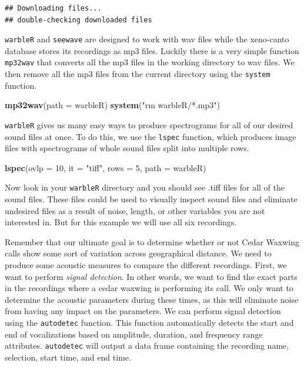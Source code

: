 \documentclass[
]{krantz}
\newenvironment{Shaded}{\begin{snugshade}}{\end{snugshade}}
\newcommand{\DataTypeTok}[1]{\textcolor[rgb]{0.13,0.29,0.53}{#1}}
\newcommand{\DecValTok}[1]{\textcolor[rgb]{0.00,0.00,0.81}{#1}}
\newcommand{\KeywordTok}[1]{\textcolor[rgb]{0.13,0.29,0.53}{\textbf{#1}}}
\newcommand{\NormalTok}[1]{#1}
\newcommand{\StringTok}[1]{\textcolor[rgb]{0.31,0.60,0.02}{#1}}
\begin{document}
\begin{verbatim}
## Downloading files...
## double-checking downloaded files
\end{verbatim}

\texttt{warbleR} and \texttt{seewave} are designed to work with wav files while the xeno-canto database stores its recordings as mp3 files. Luckily there is a very simple function \texttt{mp32wav} that converts all the mp3 files in the working directory to wav files. We then remove all the mp3 files from the current directory using the \texttt{system} function.

\begin{Shaded}
\begin{Highlighting}[]
\KeywordTok{mp32wav}\NormalTok{(}\DataTypeTok{path =} \StringTok{\textquotesingle{}warbleR\textquotesingle{}}\NormalTok{)}
\KeywordTok{system}\NormalTok{(}\StringTok{"rm warbleR/*.mp3"}\NormalTok{)}
\end{Highlighting}
\end{Shaded}

\texttt{warbleR} gives us many easy ways to produce spectrograms for all of our desired sound files at once. To do this, we use the \texttt{lspec} function, which produces image files with spectrograms of whole sound files split into multiple rows.

\begin{Shaded}
\begin{Highlighting}[]
\KeywordTok{lspec}\NormalTok{(}\DataTypeTok{ovlp =} \DecValTok{10}\NormalTok{, }\DataTypeTok{it =} \StringTok{"tiff"}\NormalTok{, }\DataTypeTok{rows =} \DecValTok{5}\NormalTok{, }\DataTypeTok{path =} \StringTok{\textquotesingle{}warbleR\textquotesingle{}}\NormalTok{)}
\end{Highlighting}
\end{Shaded}

Now look in your \texttt{warbleR} directory and you should see .tiff files for all of the sound files. These files could be used to visually inspect sound files and eliminate undesired files as a result of noise, length, or other variables you are not interested in. But for this example we will use all six recordings.

Remember that our ultimate goal is to determine whether or not Cedar Waxwing calls show some sort of variation across geographical distance. We need to produce some acoustic measures to compare the different recordings. First, we want to perform \emph{signal detection}. In other words, we want to find the exact parts in the recordings where a cedar waxwing is performing its call. We only want to determine the acoustic parameters during these times, as this will eliminate noise from having any impact on the parameters. We can perform signal detection using the \texttt{autodetec} function. This function automatically detects the start and end of vocalizations based on amplitude, duration, and frequency range attributes. \texttt{autodetec} will output a data frame containing the recording name, selection, start time, and end time.
\end{document}
